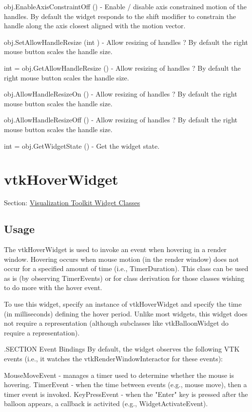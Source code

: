 \begin{DoxyItemize}
\item {\ttfamily obj.\-Enable\-Axis\-Constraint\-Off ()} -\/ Enable / disable axis constrained motion of the handles. By default the widget responds to the shift modifier to constrain the handle along the axis closest aligned with the motion vector.  
\item {\ttfamily obj.\-Set\-Allow\-Handle\-Resize (int )} -\/ Allow resizing of handles ? By default the right mouse button scales the handle size.  
\item {\ttfamily int = obj.\-Get\-Allow\-Handle\-Resize ()} -\/ Allow resizing of handles ? By default the right mouse button scales the handle size.  
\item {\ttfamily obj.\-Allow\-Handle\-Resize\-On ()} -\/ Allow resizing of handles ? By default the right mouse button scales the handle size.  
\item {\ttfamily obj.\-Allow\-Handle\-Resize\-Off ()} -\/ Allow resizing of handles ? By default the right mouse button scales the handle size.  
\item {\ttfamily int = obj.\-Get\-Widget\-State ()} -\/ Get the widget state.  
\end{DoxyItemize}\hypertarget{vtkwidgets_vtkhoverwidget}{}\section{vtk\-Hover\-Widget}\label{vtkwidgets_vtkhoverwidget}
Section\-: \hyperlink{sec_vtkwidgets}{Visualization Toolkit Widget Classes} \hypertarget{vtkwidgets_vtkxyplotwidget_Usage}{}\subsection{Usage}\label{vtkwidgets_vtkxyplotwidget_Usage}
The vtk\-Hover\-Widget is used to invoke an event when hovering in a render window. Hovering occurs when mouse motion (in the render window) does not occur for a specified amount of time (i.\-e., Timer\-Duration). This class can be used as is (by observing Timer\-Events) or for class derivation for those classes wishing to do more with the hover event.

To use this widget, specify an instance of vtk\-Hover\-Widget and specify the time (in milliseconds) defining the hover period. Unlike most widgets, this widget does not require a representation (although subclasses like vtk\-Balloon\-Widget do require a representation).

.S\-E\-C\-T\-I\-O\-N Event Bindings By default, the widget observes the following V\-T\-K events (i.\-e., it watches the vtk\-Render\-Window\-Interactor for these events)\-: 
\begin{DoxyPre}
   MouseMoveEvent - manages a timer used to determine whether the mouse
                    is hovering.
   TimerEvent - when the time between events (e.g., mouse move), then a
                timer event is invoked.
   KeyPressEvent - when the "Enter" key is pressed after the balloon appears,
                   a callback is activited (e.g., WidgetActivateEvent).
 \end{DoxyPre}


